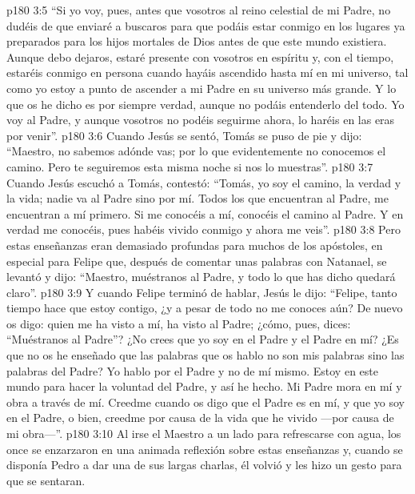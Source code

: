 \vs p180 3:5 “Si yo voy, pues, antes que vosotros al reino celestial de mi Padre, no dudéis de que enviaré a buscaros para que podáis estar conmigo en los lugares ya preparados para los hijos mortales de Dios antes de que este mundo existiera. Aunque debo dejaros, estaré presente con vosotros en espíritu y, con el tiempo, estaréis conmigo en persona cuando hayáis ascendido hasta mí en mi universo, tal como yo estoy a punto de ascender a mi Padre en su universo más grande. Y lo que os he dicho es por siempre verdad, aunque no podáis entenderlo del todo. Yo voy al Padre, y aunque vosotros no podéis seguirme ahora, lo haréis en las eras por venir”.
\vs p180 3:6 Cuando Jesús se sentó, Tomás se puso de pie y dijo: “Maestro, no sabemos adónde vas; por lo que evidentemente no conocemos el camino. Pero te seguiremos esta misma noche si nos lo muestras”.
\vs p180 3:7 Cuando Jesús escuchó a Tomás, contestó: “Tomás, yo soy el camino, la verdad y la vida; nadie va al Padre sino por mí. Todos los que encuentran al Padre, me encuentran a mí primero. Si me conocéis a mí, conocéis el camino al Padre. Y en verdad me conocéis, pues habéis vivido conmigo y ahora me veis”.
\vs p180 3:8 Pero estas enseñanzas eran demasiado profundas para muchos de los apóstoles, en especial para Felipe que, después de comentar unas palabras con Natanael, se levantó y dijo: “Maestro, muéstranos al Padre, y todo lo que has dicho quedará claro”.
\vs p180 3:9 Y cuando Felipe terminó de hablar, Jesús le dijo: “Felipe, tanto tiempo hace que estoy contigo, ¿y a pesar de todo no me conoces aún? De nuevo os digo: quien me ha visto a mí, ha visto al Padre; ¿cómo, pues, dices: “Muéstranos al Padre”? ¿No crees que yo soy en el Padre y el Padre en mí? ¿Es que no os he enseñado que las palabras que os hablo no son mis palabras sino las palabras del Padre? Yo hablo por el Padre y no de mí mismo. Estoy en este mundo para hacer la voluntad del Padre, y así he hecho. Mi Padre mora en mí y obra a través de mí. Creedme cuando os digo que el Padre es en mí, y que yo soy en el Padre, o bien, creedme por causa de la vida que he vivido ---por causa de mi obra---”.
\vs p180 3:10 Al irse el Maestro a un lado para refrescarse con agua, los once se enzarzaron en una animada reflexión sobre estas enseñanzas y, cuando se disponía Pedro a dar una de sus largas charlas, él volvió y les hizo un gesto para que se sentaran.

